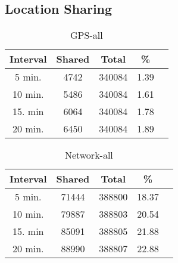 \subsection{Location Sharing}
\label{subsec-locationsharing}

\begin{table}
	\centering
		\begin{tabular}{|c|c|c|c|c|}\hline
		\textbf{Interval} & \textbf{Shared} & \textbf{Total} & \textbf{\%}\\\hline\hline
		5 min. & 4742 & 340084 & 1.39\\\hline\hline
		10 min. & 5486 & 340084 & 1.61\\\hline
		15. min & 6064 & 340084 & 1.78\\\hline
		20 min. & 6450 & 340084 & 1.89\\\hline
		\end{tabular}
	\caption{GPS-all}
	\label{tab:gps_sharing}
\end{table}

\begin{table}
	\centering
		\begin{tabular}{|c|c|c|c|c|}\hline
		\textbf{Interval} & \textbf{Shared} & \textbf{Total} & \textbf{\%}\\\hline\hline
		5 min. & 71444 & 388800 & 18.37\\\hline\hline
		10 min. & 79887 & 388803 & 20.54\\\hline
		15. min & 85091 & 388805 & 21.88\\\hline
		20 min. & 88990 & 388807 & 22.88\\\hline
		\end{tabular}
	\caption{Network-all}
	\label{tab:network_sharing}
\end{table}